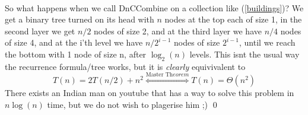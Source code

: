 \documentclass{article}
\theoremstyle{remark}
\numberwithin{equation}{section}
\begin{document}
	\\So what happens when we call DnCCombine on a collection like (\ref{buildings})? We get a binary tree turned on its head with $n$ nodes at the top each of size 1, in the second layer we get $n/2$ nodes of size 2, and at the third layer we have $n/4$ nodes of size 4, and at the i'th level we have $n/2^{i-1}$ nodes of size $2^{i-1}$, until we reach the bottom with 1 node of size n, after $\log_2(n)$ levels. This isnt the usual way the recurrence formula/tree works, but it is \textit{clearly} equivivalent to
	\begin{equation}
		T(n) = 2T(n/2)+n^2 \stackrel{\text{Master Th}eorem}{\iff} T(n) = \Theta(n^2)
	\end{equation}
	There exists an Indian man on youtube that has a way to solve this problem in $n\log(n)$ time, but we do not wish to plagerise him ;) \qed
\end{document}
